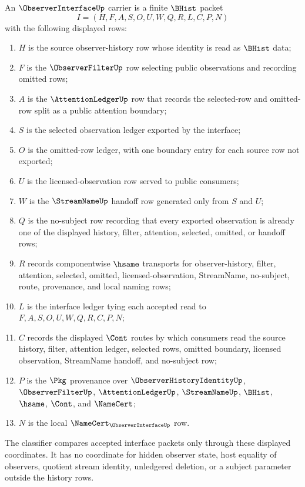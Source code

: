 \begin{definition}
\label{def:observer-interface-carrier}
An $\ObserverInterfaceUp$ carrier is a finite $\BHist$ packet
$$
I=(H,F,A,S,O,U,W,Q,R,L,C,P,N)
$$
with the following displayed rows:
\begin{enumerate}
\item $H$ is the source observer-history row whose identity is read as $\BHist$ data;
\item $F$ is the $\ObserverFilterUp$ row selecting public observations and recording omitted rows;
\item $A$ is the $\AttentionLedgerUp$ row that records the selected-row and omitted-row split as a public attention boundary;
\item $S$ is the selected observation ledger exported by the interface;
\item $O$ is the omitted-row ledger, with one boundary entry for each source row not exported;
\item $U$ is the licensed-observation row served to public consumers;
\item $W$ is the $\StreamNameUp$ handoff row generated only from $S$ and $U$;
\item $Q$ is the no-subject row recording that every exported observation is already one of the displayed history, filter, attention, selected, omitted, or handoff rows;
\item $R$ records componentwise $\hsame$ transports for observer-history, filter, attention, selected, omitted, licensed-observation, StreamName, no-subject, route, provenance, and local naming rows;
\item $L$ is the interface ledger tying each accepted read to $F,A,S,O,U,W,Q,R,C,P,N$;
\item $C$ records the displayed $\Cont$ routes by which consumers read the source history, filter, attention ledger, selected rows, omitted boundary, licensed observation, StreamName handoff, and no-subject row;
\item $P$ is the $\Pkg$ provenance over $\ObserverHistoryIdentityUp$, $\ObserverFilterUp$, $\AttentionLedgerUp$, $\StreamNameUp$, $\BHist$, $\hsame$, $\Cont$, and $\NameCert$;
\item $N$ is the local $\NameCert_{\ObserverInterfaceUp}$ row.
\end{enumerate}
The classifier compares accepted interface packets only through these displayed coordinates. It has no coordinate for hidden observer state, host equality of observers, quotient stream identity, unledgered deletion, or a subject parameter outside the history rows.
\end{definition}

